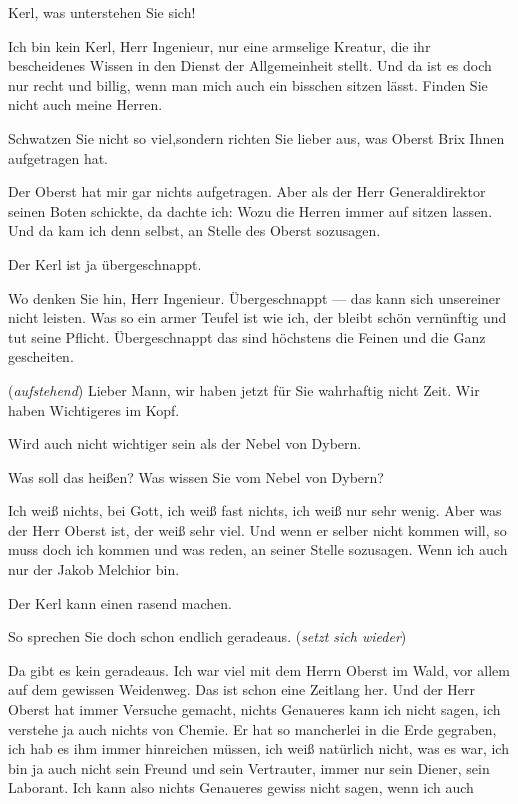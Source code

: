 \documentclass[
	final,
	a4paper,
	ngerman,
	mpinclude = true, %
	twoside = true,
	open = right,
	cleardoublepage = plain,
	DIV = 13,
	BCOR = 1cm,
	titlepage = firstiscover,
	]{scrbook}
\newcommand{\direction}[1]{(\textit{#1})}
\newcommand{\thecharacter}[1]{\textup{\textsc{#1}}\xspace}
\newcommand{\theAlexis}{\thecharacter{Alexis}}
\newcommand{\theMelchior}{\thecharacter{Melchior}}
\newcommand{\character}[1]{\item[#1]}
\newcommand{\Generaldirektor}{\character{Direktor}}
\newcommand{\Alexis}{\character{\theAlexis}}
\newcommand{\Melchior}{\character{\theMelchior}}
\begin{document}
\begin{play}
\Alexis
Kerl, was unterstehen Sie sich!

\Melchior
Ich bin kein Kerl, Herr Ingenieur, nur eine armselige Kreatur, die ihr bescheidenes Wissen in den Dienst der Allgemeinheit stellt. Und da ist es doch nur recht und billig, wenn man mich auch ein bisschen sitzen lässt. Finden Sie nicht auch meine Herren.

\Generaldirektor
Schwatzen Sie nicht so viel,sondern richten Sie lieber aus, was Oberst Brix Ihnen aufgetragen hat.

\Melchior
Der Oberst hat mir gar nichts aufgetragen. Aber als der Herr Generaldirektor seinen Boten schickte, da dachte ich: Wozu die Herren immer auf sitzen lassen. Und da kam ich denn selbst, an Stelle des Oberst sozusagen.

\Alexis
Der Kerl ist ja übergeschnappt.

\Melchior
Wo denken Sie hin, Herr Ingenieur. Übergeschnappt --- das kann sich unsereiner nicht leisten. Was so ein armer Teufel ist wie ich, der bleibt schön vernünftig und tut seine Pflicht. Übergeschnappt das sind höchstens die Feinen und die Ganz gescheiten.

\Generaldirektor
\direction{aufstehend} Lieber Mann, wir haben jetzt für Sie wahrhaftig nicht Zeit. Wir haben Wichtigeres im Kopf.

\Melchior
Wird auch nicht wichtiger sein als der Nebel von Dybern.

\Alexis
Was soll das heißen? Was wissen Sie vom Nebel von Dybern?

\Melchior
Ich weiß nichts, bei Gott, ich weiß fast nichts, ich weiß nur sehr wenig. Aber was der Herr Oberst ist, der weiß sehr viel. Und wenn er selber nicht kommen will, so muss doch ich kommen und was reden, an seiner Stelle sozusagen. Wenn ich auch nur der Jakob Melchior bin.

\Alexis
Der Kerl kann einen rasend machen.

\Generaldirektor
So sprechen Sie doch schon endlich geradeaus. \direction{setzt sich wieder}

\Melchior
Da gibt es kein geradeaus. Ich war viel mit dem Herrn Oberst im Wald, vor allem auf dem gewissen Weidenweg. Das ist schon eine Zeitlang her. Und der Herr Oberst hat immer Versuche gemacht, nichts Genaueres kann ich nicht sagen, ich verstehe ja auch nichts von Chemie. Er hat so mancherlei in die Erde gegraben, ich hab es ihm immer hinreichen müssen, ich weiß natürlich nicht, was es war, ich bin ja auch nicht sein Freund und sein Vertrauter, immer nur sein Diener, sein Laborant. Ich kann also nichts Genaueres gewiss nicht sagen, wenn ich auch


\end{play}
\end{document}
